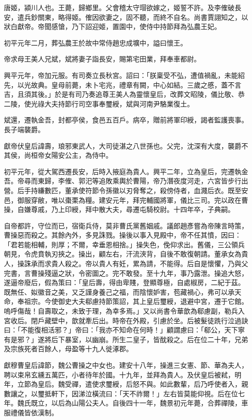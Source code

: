 \begin{pinyinscope}
唐姬，潁川人也。王薨，歸鄉里。父會稽太守瑁欲嫁之，姬誓不許。及李傕破長安，遣兵鈔關東，略得姬。傕因欲妻之，固不聽，而終不自名。尚書賈詡知之，以狀白獻帝。帝聞感愴，乃下詔迎姬，置園中，使侍中持節拜為弘農王妃。

初平元年二月，葬弘農王於故中常侍趙忠成壙中，謚曰懷王。

帝求母王美人兄斌，斌將妻子詣長安，賜第宅田業，拜奉車都尉。

興平元年，帝加元服。有司奏立長秋宮。詔曰：「朕稟受不弘，遭值禍亂，未能紹先，以光故典。皇母前薨，未卜宅兆，禮章有闕，中心如結。三歲之慼，蓋不言吉，且須其後。」於是有司乃奏追尊王美人為靈懷皇后，改葬文昭陵，儀比敬、恭二陵，使光祿大夫持節行司空事奉璽綬，斌與河南尹駱業復土。

斌還，遷執金吾，封都亭侯，食邑五百戶。病卒，贈前將軍印綬，謁者監護喪事。長子端襲爵。

獻帝伏皇后諱壽，琅邪東武人，大司徒湛之八世孫也。父完，沈深有大度，襲爵不其侯，尚桓帝女陽安公主，為侍中。

初平元年，從大駕西遷長安，后時入掖庭為貴人。興平二年，立為皇后，完遷執金吾。帝尋而東歸，李傕、郭汜等追敗乘輿於曹陽，帝乃潛夜度河走，六宮皆步行出營。后手持縑數匹，董承使符節令孫徽以刃脅奪之，殺傍侍者，血濺后衣。既至安邑，御服穿敝，唯以棗栗為糧。建安元年，拜完輔國將軍，儀比三司。完以政在曹操，自嫌尊戚，乃上印綬，拜中散大夫，尋遷屯騎校尉。十四年卒，子典嗣。

自帝都許，守位而已，宿衛兵侍，莫非曹氏黨舊姻戚。議郎趙彥嘗為帝陳言時策，曹操惡而殺之。其餘內外，多見誅戮。操後以事入見殿中，帝不任其憤，因曰：「君若能相輔，則厚；不爾，幸垂恩相捨。」操失色，俛仰求出。舊儀，三公領兵朝見，令虎賁執刃挾之。操出，顧左右，汗流浹背，自後不敢復朝請。董承女為貴人，操誅承而求貴人殺之。帝以貴人有妊，累為請，不能得。后自是懷懼，乃與父完書，言曹操殘逼之狀，令密圖之。完不敢發。至十九年，事乃露泄。操追大怒，遂逼帝廢后，假為策曰：「皇后壽，得由卑賤，登顯尊極，自處椒房，二紀于茲。既無任、姒徽音之美，又乏謹身養己之福，而陰懷妒害，苞藏禍心，弗可以承天命，奉祖宗。今使御史大夫郗慮持節策詔，其上皇后璽綬，退避中宮，遷于它館。嗚呼傷哉！自壽取之，未致于理，為幸多焉。」又以尚書令華歆為郗慮副，勒兵入宮收后。閉戶藏壁中，歆就牽后出。時帝在外殿，引慮於坐。后被髮徒跣行泣過訣曰：「不能復相活邪？」帝曰：「我亦不知命在何時！」顧謂慮曰：「郗公，天下寧有是邪？」遂將后下暴室，以幽崩。所生二皇子，皆酖殺之。后在位二十年，兄弟及宗族死者百餘人，母盈等十九人徙涿郡。

獻穆曹皇后諱節，魏公曹操之中女也。建安十八年，操進三女憲、節、華為夫人，聘以束帛玄纁五萬匹，小者待年於國。十九年，並拜為貴人。及伏皇后被弒，明年，立節為皇后。魏受禪，遣使求璽綬，后怒不與。如此數輩，后乃呼使者入，親數讓之，以璽抵軒下，因涕泣橫流曰：「天不祚爾！」左右皆莫能仰視。后在位七年。魏氏既立，以后為山陽公夫人。自後四十一年，魏景初元年薨，合葬禪陵，車服禮儀皆依漢制。


\end{pinyinscope}
